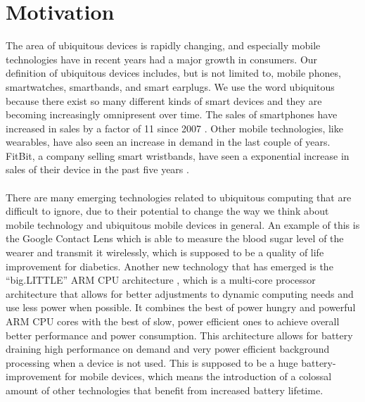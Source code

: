 
\chapter{Motivation}
\label{cha:motivation}

The area of ubiquitous devices is rapidly changing, and especially mobile technologies have in recent years had a major growth in consumers. Our definition of ubiquitous devices includes, but is not limited to, mobile phones, smartwatches, smartbands, and smart earplugs. We use the word ubiquitous because there exist so many different kinds of smart devices and they are becoming increasingly omnipresent over time. The sales of smartphones have increased in sales by a factor of 11 since 2007 \parencite{statsia_smartphones}. Other mobile technologies, like wearables, have also seen an increase in demand in the last couple of years. FitBit, a company selling smart wristbands, have seen a exponential increase in sales of their device in the past five years \parencite{statsia_fitbit}.
\\\\
There are many emerging technologies related to ubiquitous computing that are difficult to ignore, due to their potential to change the way we think about mobile technology and ubiquitous mobile devices in general. An example of this is the Google Contact Lens \parencite{google_contact_lens} which is able to measure the blood sugar level of the wearer and transmit it wirelessly, which is supposed to be a quality of life improvement for diabetics. Another new technology that has emerged is the ``big.LITTLE'' ARM CPU architecture \parencite{big_little_architecture}, which is a multi-core processor architecture that allows for better adjustments to dynamic computing needs and use less power when possible. It combines the best of power hungry and powerful ARM CPU cores with the best of slow, power efficient ones to achieve overall better performance and power consumption. This architecture allows for battery draining high performance on demand and very power efficient background processing when a device is not used. This is supposed to be a huge battery-improvement for mobile devices, which means the introduction of a colossal amount of other technologies that benefit from increased battery lifetime. 
